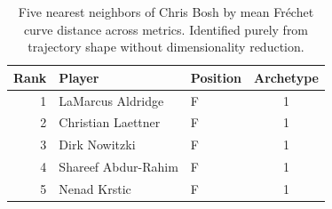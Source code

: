 \begin{table}[htbp]
  \centering\small
  \begin{tabular}{rllc}
    \toprule
    Rank & Player & Position & Archetype \\
    \midrule
    1 & LaMarcus Aldridge & F & 1 \\
    2 & Christian Laettner & F & 1 \\
    3 & Dirk Nowitzki & F & 1 \\
    4 & Shareef Abdur-Rahim & F & 1 \\
    5 & Nenad Krstic & F & 1 \\
    \bottomrule
  \end{tabular}
  \caption{Five nearest neighbors of Chris Bosh by mean Fr\'{e}chet curve distance across metrics. Identified purely from trajectory shape without dimensionality reduction.}
  \label{tab:Chris_Bosh_frechet_curve_neighbors}
\end{table}

